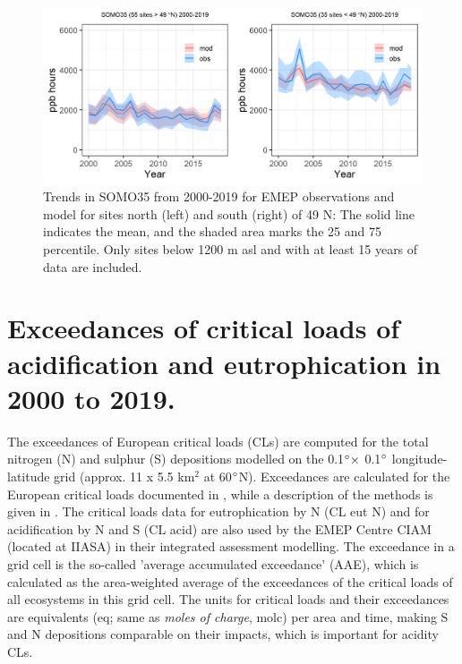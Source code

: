 \begin{figure}
	\centering
	\includegraphics[width=0.74\paperwidth]{FIGS_TRENDS/SOMO35_2000_2019_1200m.png}
	\caption{\label{fig:O3_somo35trends}Trends in SOMO35 from 2000-2019 for EMEP observations and model for sites north (left) and south (right) of 49 N: The solid line indicates the mean, and the shaded area marks the 25 and 75 percentile. Only sites below 1200 m asl and with at least 15 years of data are included.}
\end{figure}

\section{Exceedances of critical loads of acidification and eutrophication in 2000 to 2019.}
\label{subs:exceedSnN}

The exceedances of European critical loads (CLs) are computed for the total nitrogen
(N) and sulphur (S) depositions modelled on the 0.1$^\circ \times$ 0.1$^\circ$
longitude-latitude grid (approx. 11 x 5.5 km$^{2}$ at 60$^\circ$N).
Exceedances are calculated for the European critical loads documented in \cite{Hettelingh:2017}, while
a description of the methods is given in \cite{DeVries:2015}. The
critical loads data for eutrophication by N (CL eut N) and for acidification by N and S
(CL acid) are also used by the EMEP Centre CIAM (located at IIASA) in their integrated assessment
modelling. The exceedance in a grid cell is the so-called ’average accumulated
exceedance’ (AAE), which is calculated as the area-weighted average of the
exceedances of the critical loads of all ecosystems in this grid cell. The units for
critical loads and their exceedances are equivalents (eq; same as \textit{moles of charge},
molc) per area and time, making S and N depositions comparable on their impacts, which is important for
acidity CLs.

